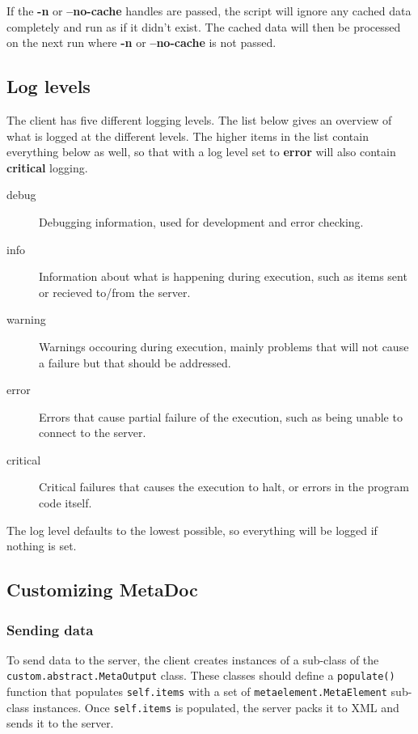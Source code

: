 \documentclass[titlepage, a4paper,10pt]{article}
\begin{document}
If the \textbf{-n} or \textbf{--no-cache} handles are passed, the script will
ignore any cached data completely and run as if it didn't exist. The cached
data will then be processed on the next run where \textbf{-n} or
\textbf{--no-cache} is not passed.

\subsection{Log levels}
\label{sec:loglevels}
The client has five different logging levels. The list below gives an overview
of what is logged at the different levels. The higher items in the list contain
everything below as well, so that with a log level set to \textbf{error} will
also contain \textbf{critical} logging.

\begin{description}
    \item[debug]    Debugging information, used for development and error
    checking.
    \item[info] Information about what is happening during execution, such as
    items sent or recieved to/from the server.
    \item[warning]  Warnings occouring during execution, mainly problems that
    will not cause a failure but that should be addressed.
    \item[error]    Errors that cause partial failure of the execution, such as
    being unable to connect to the server.
    \item[critical] Critical failures that causes the execution to halt, or
    errors in the program code itself.
\end{description}

The log level defaults to the lowest possible, so everything will be logged if
nothing is set.

\subsection{Customizing MetaDoc}
\label{sec:customizing_client}

\subsubsection{Sending data}
To send data to the server, the client creates instances of a sub-class of the
\\
\texttt{custom.abstract.MetaOutput} class. These classes should define a
\texttt{populate()} function that populates \texttt{self.items} with a set of
\texttt{metaelement.MetaElement} sub-class instances. Once \texttt{self.items}
is populated, the server packs it to XML and sends it to the server.
\end{document}
